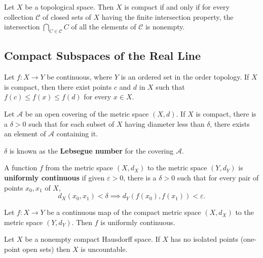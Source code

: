\begin{theorem}
Let $X$ be a topological space. Then $X$ is compact if and only if for every collection $\mathscr{C}$ of closed sets of $X$ having the finite intersection property,
the intersection $\bigcap_{C \in \mathscr{C}} C$ of all the elements of $\mathscr{C}$ is nonempty.
\end{theorem}

\subsection{Compact Subspaces of the Real Line}

\begin{theorem}
Let $f\colon X \rightarrow Y$ be continuous, where $Y$ is an ordered set in the order topology. If $X$ is compact, then there exist points $c$ and $d$ in $X$ such that $f(c) \leq f(x) \leq f(d)$ for every $x \in X$.
\end{theorem}

\begin{lemma}
Let $\mathscr{A}$ be an open covering of the metric space $(X, d)$. If $X$ is compact, there is a $\delta > 0$ such that for each subset of $X$ having diameter less than $\delta$, 
there exists an element of $\mathscr{A}$ containing it.
\end{lemma}

\begin{remark}
$\delta$ is known as the \textbf{Lebsegue number} for the covering $\mathscr{A}$.
\end{remark}

\begin{definition}
A function $f$ from the metric space $(X, d_X)$ to the metric space $(Y, d_Y)$ is \textbf{uniformly continuous} if given $\varepsilon > 0$, there is a
$\delta > 0$ such that for every pair of points $x_0, x_1$ of $X$,
\[
    d_X(x_0, x_1) < \delta \implies d_Y(f(x_0), f(x_1)) < \varepsilon.
\]
\end{definition}

\begin{theorem}
Let $f\colon X \rightarrow  Y$ be a continuous map of the compact metric space $(X, d_X)$ to the metric space $(Y, d_Y)$. Then $f$ is uniformly continuous.
\end{theorem}

\begin{theorem}
Let $X$ be a nonempty compact Hausdorff space. If $X$ has no isolated points (one-point open sets) then $X$ is uncountable.
\end{theorem}

